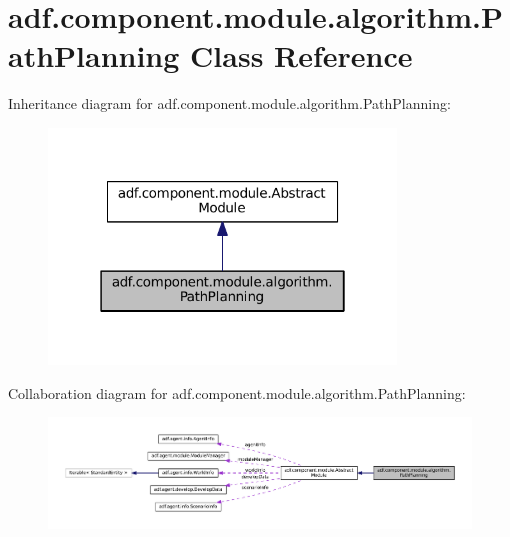 \hypertarget{classadf_1_1component_1_1module_1_1algorithm_1_1PathPlanning}{}\section{adf.\+component.\+module.\+algorithm.\+Path\+Planning Class Reference}
\label{classadf_1_1component_1_1module_1_1algorithm_1_1PathPlanning}


Inheritance diagram for adf.\+component.\+module.\+algorithm.\+Path\+Planning\+:
\nopagebreak
\begin{figure}[H]
\begin{center}
\leavevmode
\includegraphics[width=262pt]{classadf_1_1component_1_1module_1_1algorithm_1_1PathPlanning__inherit__graph}
\end{center}
\end{figure}


Collaboration diagram for adf.\+component.\+module.\+algorithm.\+Path\+Planning\+:
\nopagebreak
\begin{figure}[H]
\begin{center}
\leavevmode
\includegraphics[width=350pt]{classadf_1_1component_1_1module_1_1algorithm_1_1PathPlanning__coll__graph}
\end{center}
\end{figure}

